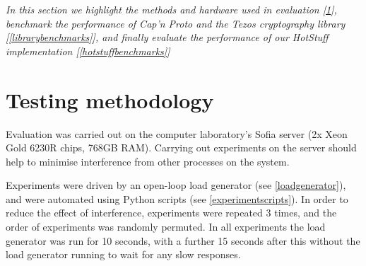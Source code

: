 



\textit{In this section we highlight the methods and hardware used in evaluation [\ref{testingmethods}], benchmark the performance of Cap'n Proto and the Tezos cryptography library [\ref{librarybenchmarks}], and finally evaluate the performance of our HotStuff implementation [\ref{hotstuffbenchmarks}]}

\section{Testing methodology} \label{testingmethods}
Evaluation was carried out on the computer laboratory's Sofia server (2x Xeon Gold 6230R chips, 768GB RAM). Carrying out experiments on the server should help to minimise interference from other processes on the system.

Experiments were driven by an open-loop load generator (see \ref{loadgenerator}), and were automated using Python scripts (see \ref{experimentscripts}). In order to reduce the effect of interference, experiments were repeated 3 times, and the order of experiments was randomly permuted. In all experiments the load generator was run for 10 seconds, with a further 15 seconds after this without the load generator running to wait for any slow responses.

